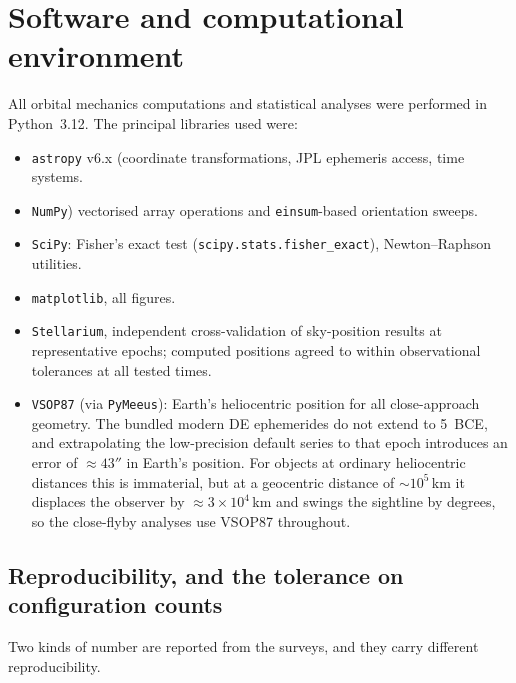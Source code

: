 \documentclass[11pt,a4paper]{article}
\begin{document}
\section{Software and computational environment}

All orbital mechanics computations and statistical analyses were performed
in Python~3.12. The principal libraries used were:

\begin{itemize}
  \item \texttt{astropy} v6.x\cite{astropy2022} (coordinate
    transformations, JPL ephemeris access, time systems.
  \item \texttt{NumPy}\cite{harris2020}) vectorised array operations
    and \texttt{einsum}-based orientation sweeps.
  \item \texttt{SciPy}\cite{virtanen2020}: Fisher's exact test
    (\texttt{scipy.stats.fisher\_exact}), Newton--Raphson utilities.
  \item \texttt{matplotlib}\cite{hunter2007}, all figures.
  \item \texttt{Stellarium}\cite{stellarium2021}, independent cross-validation
    of sky-position results at representative epochs; computed positions
    agreed to within observational tolerances at all tested times.
  \item \texttt{VSOP87} (via \texttt{PyMeeus}): Earth's heliocentric position
    for all close-approach geometry.  The bundled modern DE ephemerides do not
    extend to 5~BCE, and extrapolating the low-precision default series to that
    epoch introduces an error of ${\approx}43''$ in Earth's position.  For
    objects at ordinary heliocentric distances this is immaterial, but at a
    geocentric distance of ${\sim}10^{5}$\,km it displaces the observer by
    ${\approx}3\times10^{4}$\,km and swings the sightline by degrees, so the
    close-flyby analyses use VSOP87 throughout.
\end{itemize}

\subsection{Reproducibility, and the tolerance on configuration counts}
\label{subsec:reproducibility}

Two kinds of number are reported from the surveys, and they carry different
reproducibility.
\end{document}
